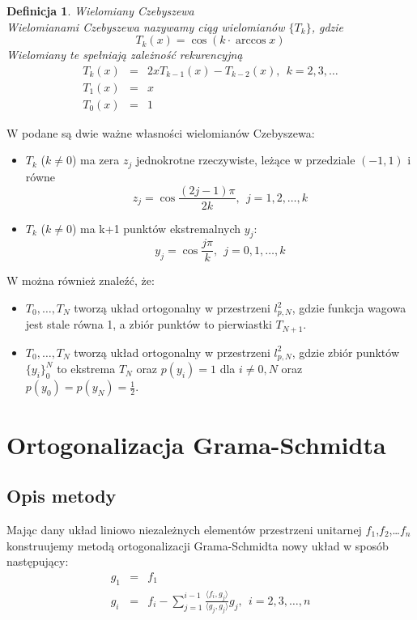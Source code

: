 \documentclass[12pt,wide]{mwart}
\newtheorem{defin}{Definicja}
\begin{document}
\begin{defin}{Wielomiany Czebyszewa}\\
Wielomianami Czebyszewa nazywamy ciąg wielomianów $\{T_k\}$, gdzie 
$$
	T_k(x) = \cos(k \cdot \arccos x)
$$
Wielomiany te spełniają zależność rekurencyjną
\begin{eqnarray*}
T_k(x) &=& 2xT_{k-1}(x) - T_{k-2}(x), \ \ k = 2,3,\ldots \\
T_1(x) &=& x\\
T_0(x) &=& 1
\end{eqnarray*}
\end{defin}
W \cite[strony 98-99]{JMJ} podane są dwie ważne własności wielomianów Czebyszewa:
\begin{itemize}
\item $T_k$ ($k \neq 0$) ma zera $z_j$ jednokrotne rzeczywiste, leżące w przedziale $(-1,1)$ i równe
$$
	z_j = \cos\frac{(2j-1)\pi}{2k}, \ \  j = 1,2,\ldots,k
$$
\item $T_k$ ($k \neq 0$) ma k+1 punktów ekstremalnych $y_j$:
$$
y_j = \cos \frac{j\pi}{k}, \ \ j = 0,1,\ldots,k
$$
\end{itemize}
W \cite{Czeb} można również znaleźć, że:
\begin{itemize}
\item $T_0,\ldots,T_N$ tworzą układ ortogonalny w przestrzeni $l^2_{p,N}$, gdzie funkcja wagowa jest stale równa 1, a zbiór punktów to pierwiastki $T_{N+1}$.
\item $T_0,\ldots,T_N$ tworzą układ ortogonalny w przestrzeni $l^2_{p,N}$, gdzie zbiór punktów $\{y_i\}_0^N$ to ekstrema $T_{N}$ oraz $p(y_i) = 1$ dla $i \neq 0,N$ oraz $p(y_0) = p(y_N) = \frac{1}{2}$.
\end{itemize}


\section{Ortogonalizacja Grama-Schmidta}
\subsection{Opis metody}
Mając dany układ liniowo niezależnych elementów przestrzeni unitarnej $f_1$,$f_2$,\ldots$f_n$ konstruujemy metodą ortogonalizacji Grama-Schmidta nowy układ w sposób następujący:
\begin{eqnarray*}
	g_1 &=& f_1 \\
	g_i &=& f_i - \sum^{i-1}_{j=1} \frac{\langle f_i,g_j\rangle}{\langle g_j,g_j\rangle}g_j,  \ \  i = 2,3,\ldots,n
\end{eqnarray*}
\end{document}
